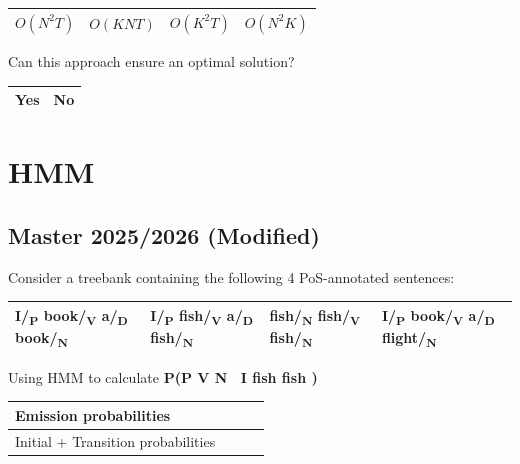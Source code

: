\documentclass{../extra/aakpract/aakpract}
\begin{document}
	\begin{center}
		\begin{tabular}{|llll|}
			\hline
			\Circle $ O(N^2T) $ & \Circle $ O(KNT) $ & \Circle $ O(K^2T) $ & \Circle $ O(N^2K) $ \\
			\hline
		\end{tabular}
	\end{center}
	
	Can this approach ensure an optimal solution?
	
	\begin{center}
		\begin{tabular}{|ll|}
			\hline
			\Circle Yes & \Circle No \\
			\hline
		\end{tabular}
	\end{center}
	
	
	
	\section{HMM}
	
	\subsection{Master 2025/2026 (Modified)}
	
	Consider a treebank containing the following 4 PoS-annotated sentences: 
	\begin{center}
		\begin{tabular}{|l|l|l|l|}
			\hline
			I/\textsubscript{P} book/\textsubscript{V} a/\textsubscript{D} book/\textsubscript{N} &
			I/\textsubscript{P} fish/\textsubscript{V} a/\textsubscript{D} fish/\textsubscript{N} &
			fish/\textsubscript{N} fish/\textsubscript{V} fish/\textsubscript{N} &
			I/\textsubscript{P} book/\textsubscript{V} a/\textsubscript{D} flight/\textsubscript{N} \\
			\hline
		\end{tabular}
	\end{center}
	
	Using HMM to calculate \textbf{P(P V N \textbar\ I fish fish )}
	
	\begin{center}
		\begin{tabular}{|p{}|p{}|p{}|p{}|}
			\hline
			Emission probabilities &&&\\
			\hline
			Initial + Transition probabilities &&&\\
			\hline
		\end{tabular}
	\end{center}
	
\end{document}
